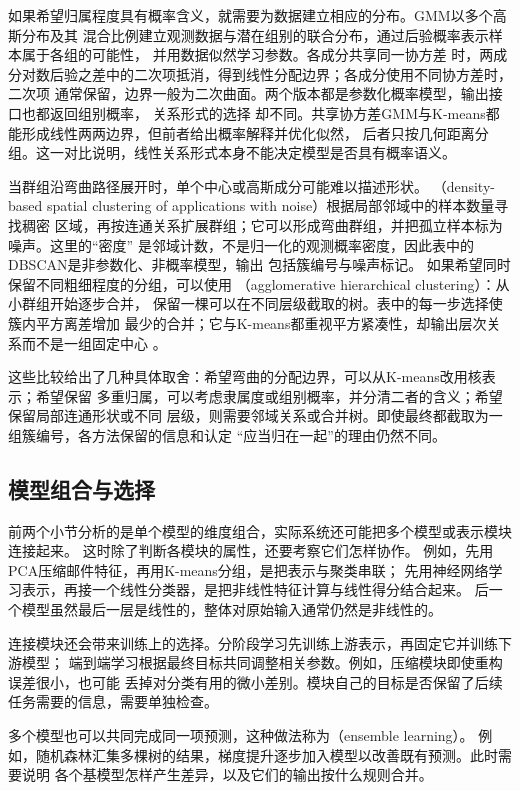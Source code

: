 如果希望归属程度具有概率含义，就需要为数据建立相应的分布。GMM以多个高斯分布及其
混合比例建立观测数据与潜在组别的联合分布，通过后验概率表示样本属于各组的可能性，
并用数据似然学习参数。各成分共享同一协方差
时，两成分对数后验之差中的二次项抵消，得到线性分配边界；各成分使用不同协方差时，二次项
通常保留，边界一般为二次曲面。两个版本都是参数化概率模型，输出接口也都返回组别概率，
关系形式的选择
却不同。共享协方差GMM与K-means都能形成线性两两边界，但前者给出概率解释并优化似然，
后者只按几何距离分组。这一对比说明，线性关系形式本身不能决定模型是否具有概率语义。

当群组沿弯曲路径展开时，单个中心或高斯成分可能难以描述形状。
（density-based spatial clustering of applications with noise）根据局部邻域中的样本数量寻找稠密
区域，再按连通关系扩展群组；它可以形成弯曲群组，并把孤立样本标为噪声。这里的“密度”
是邻域计数，不是归一化的观测概率密度，因此表中的DBSCAN是非参数化、非概率模型，输出
包括簇编号与噪声标记。
如果希望同时保留不同粗细程度的分组，可以使用
（agglomerative hierarchical clustering）：从小群组开始逐步合并，
保留一棵可以在不同层级截取的树。表中的每一步选择使簇内平方离差增加
最少的合并；它与K-means都重视平方紧凑性，却输出层次关系而不是一组固定中心
。

这些比较给出了几种具体取舍：希望弯曲的分配边界，可以从K-means改用核表示；希望保留
多重归属，可以考虑隶属度或组别概率，并分清二者的含义；希望保留局部连通形状或不同
层级，则需要邻域关系或合并树。即使最终都截取为一组簇编号，各方法保留的信息和认定
“应当归在一起”的理由仍然不同。

\FloatBarrier
\subsection{模型组合与选择}
\label{sec:models-combination-selection}

前两个小节分析的是单个模型的维度组合，实际系统还可能把多个模型或表示模块连接起来。
这时除了判断各模块的属性，还要考察它们怎样协作。
例如，先用PCA压缩邮件特征，再用K-means分组，是把表示与聚类串联；
先用神经网络学习表示，再接一个线性分类器，是把非线性特征计算与线性得分结合起来。
后一个模型虽然最后一层是线性的，整体对原始输入通常仍然是非线性的。

连接模块还会带来训练上的选择。分阶段学习先训练上游表示，再固定它并训练下游模型；
端到端学习根据最终目标共同调整相关参数。例如，压缩模块即使重构误差很小，也可能
丢掉对分类有用的微小差别。模块自己的目标是否保留了后续任务需要的信息，需要单独检查。

多个模型也可以共同完成同一项预测，这种做法称为（ensemble learning）。
例如，随机森林汇集多棵树的结果，梯度提升逐步加入模型以改善既有预测。此时需要说明
各个基模型怎样产生差异，以及它们的输出按什么规则合并。

